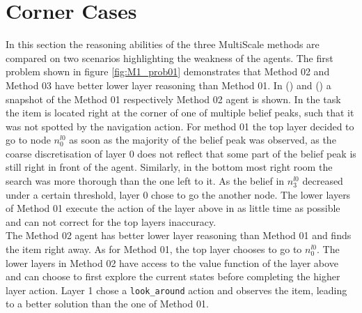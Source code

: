 \section{Corner Cases}
In this section the reasoning abilities of the three MultiScale methods are compared on two scenarios highlighting the weakness of the agents. The first problem shown in figure \ref{fig:M1_prob01} demonstrates that Method 02 and Method 03 have better lower layer reasoning than Method 01. In () and () a snapshot of the Method 01 respectively Method 02 agent is shown. In the task the item is located right at the corner of one of multiple belief peaks, such that it was not spotted by the navigation action. For method 01 the top layer decided to go to node $n_0^{l0}$ as soon as the majority of the belief peak was observed, as the coarse discretisation of layer 0 does not reflect that some part of the belief peak is still right in front of the agent. Similarly, in the bottom most right room the search was more thorough than the one left to it. As the belief in $n_3^{l0}$ decreased under a certain threshold, layer 0 chose to go the another node. The lower layers of Method 01 execute the action of the layer above in as little time as possible and can not correct for the top layers inaccuracy. \\
The Method 02 agent has better lower layer reasoning than Method 01 and finds the item right away. As for Method 01, the top layer chooses to go to $n_0^{l0}$. The lower layers in Method 02 have access to the value function of the layer above and can choose to first explore the current states before completing the higher layer action. Layer 1 chose a \texttt{look\_around} action and observes the item, leading to a better solution than the one of Method 01. \\

